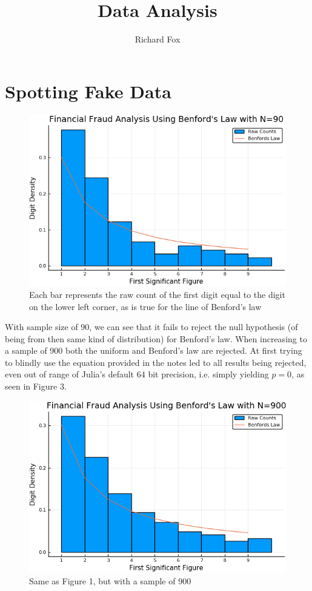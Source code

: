 \documentclass[a4paper,12pt,notitlepage]{article}
\title{Data Analysis}
\author{Richard Fox}
\date{}
\begin{document}
\maketitle

\section{Spotting Fake Data}

\begin{figure}[h]
\centering
\includegraphics[width=\textwidth]{Benford_90.png}
\caption{Each bar represents the raw count of the first digit equal to the digit on the lower left corner, as is true for the line of Benford's law}
\end{figure}

With sample size of 90, we can see that it fails to reject the null hypothesis (of being from then same kind of distribution) for Benford's law. When increasing to a sample of 900 both the uniform and Benford's law are rejected. At first trying to blindly use the equation provided in the notes led to all results being rejected, even out of range of Julia's default 64 bit precision, i.e. simply yielding $p=0$, as seen in Figure 3. 

\begin{figure}[h!]
\centering
\includegraphics[width=\textwidth]{Benford_900.png}
\caption{Same as Figure 1, but with a sample of 900}
\end{figure}
\end{document}
